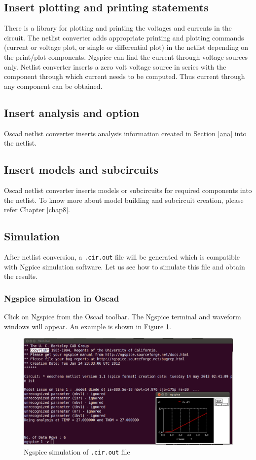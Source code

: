 \subsection{Insert plotting and printing statements}
There is a library for plotting and printing the voltages and currents in the circuit. The netlist converter adds appropriate printing and plotting commands (current or voltage plot, or single or differential plot) in the netlist depending on the print/plot components. Ngspice can find the current through voltage sources only. Netlist converter inserts a zero volt voltage source in series with the component through which current needs to be computed. Thus current through any component can be obtained.
\subsection{Insert analysis and option}
Oscad netlist converter inserts analysis information created in Section \ref{ana} into the netlist.
\subsection{Insert models and subcircuits}
Oscad netlist converter inserts models or subcircuits for required components into the netlist. To know more about model building and subcircuit creation, please refer Chapter \ref{chap8}.
\subsection{Simulation} 
After netlist conversion, a {\tt .cir.out} file will be generated which is compatible with Ngpice simulation software. Let us see how to simulate this file and obtain the results.
\subsubsection{Ngspice simulation in Oscad} 
Click on Ngspice from the Oscad toolbar.  The Ngspice terminal and waveform windows will appear. An example is shown in Figure \ref{11}.
\begin{figure}[t]
\centering
\includegraphics[width=\textwidth]{figures/11}
\caption{Ngspice simulation of {\tt .cir.out} file}
\label{11}
\end{figure}
